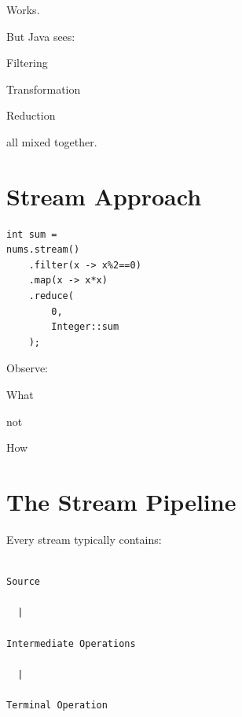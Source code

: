 \documentclass[11pt,a4paper]{book}
\begin{document}

Works.


But Java sees:


Filtering


Transformation


Reduction


all mixed together.


\section{Stream Approach}

\begin{verbatim} 
int sum =
nums.stream()
    .filter(x -> x%2==0)
    .map(x -> x*x)
    .reduce(
        0,
        Integer::sum
    );
\end{verbatim}


Observe:


What


not


How


\section{The Stream Pipeline}

Every stream typically contains:

\begin{verbatim}

Source

  |

Intermediate Operations

  |

Terminal Operation

\end{verbatim}
\end{document}
